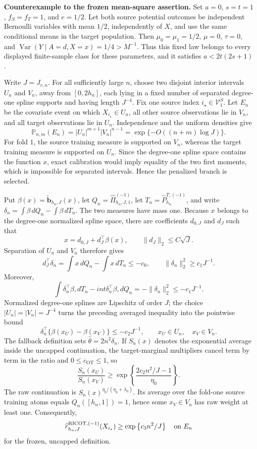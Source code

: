 \textbf{Counterexample to the frozen mean-square assertion.}
Set \(a=0\), \(s=t=1\), \(f_S=f_T=1\), and \(e=1/2\). Let both source potential outcomes be independent Bernoulli variables with mean \(1/2\), independently of \(X\), and use the same conditional means in the target population. Then \(\mu_0=\mu_1=1/2\), \(\mu=0\), \(\tau=0\), and \(\operatorname{Var}(Y\mid A=d,X=x)=1/4>M^{-1}\). Thus this fixed law belongs to every displayed finite-sample class for these parameters, and it satisfies \(a<2t(2s+1)\).

Write \(J=J_{r,n}\). For all sufficiently large \(n\), choose two disjoint interior intervals \(U_n\) and \(V_n\), away from \([0,2h_n]\), each lying in a fixed number of separated degree-one spline supports and having length \(J^{-4}\). Fix one source index \(i_\star\in\mathcal V^S_1\). Let \(E_n\) be the covariate event on which \(X_{i_\star}\in U_n\), all other source observations lie in \(V_n\), and all target observations lie in \(U_n\). Independence and the uniform densities give
\[
 \mathbb P_{n,m}(E_n)=|U_n|^{m+1}|V_n|^{n-1}
 =\exp\{-O((n+m)\log J)\}.
\]
For fold \(1\), the source training measure is supported on \(V_n\), whereas the target training measure is supported on \(U_n\). Since the degree-one spline space contains the function \(x\), exact calibration would imply equality of the two first moments, which is impossible for separated intervals. Hence the penalized branch is selected.

Put \(\beta(x)=\widetilde{\mathbf b}_{h_n,J}(x)\), let \(Q_n=\widehat\Pi^{(-1)}_{h_n,J,1}\), let \(T_n=\widehat P^{T,(-1)}_{h_n}\), and write \(\delta_n=\int\beta\,dQ_n-\int\beta\,dT_n\). The two measures have mass one. Because \(x\) belongs to the degree-one normalized spline space, there are coefficients \(d_{0,J}\) and \(d_J\) such that
\[
 x=d_{0,J}+d_J^\top\beta(x),
 \qquad \|d_J\|_2\le C\sqrt J.
\]
Separation of \(U_n\) and \(V_n\) therefore gives
\[
 d_J^\top\delta_n=\int x\,dQ_n-\int x\,dT_n\le-c_0,
 \qquad \|\delta_n\|_2^2\ge c_1J^{-1}.
\]
Moreover,
\[
 \int\delta_n^\top\beta,dT_n-int\delta_n^\top\beta,dQ_n=-\|\delta_n\|_2^2\le-c_1J^{-1}.
\]
Normalized degree-one splines are Lipschitz of order \(J\); the choice \(|U_n|=|V_n|=J^{-4}\) turns the preceding averaged inequality into the pointwise bound
\[
 \delta_n^\top\{\beta(x_U)-\beta(x_V)\}\le-c_2J^{-1},
 \qquad x_U\in U_n,\quad x_V\in V_n.
\]
The fallback definition sets \(\widehat\theta=2n^2\delta_n\). If \(S_n(x)\) denotes the exponential average inside the uncapped continuation, the target-marginal multipliers cancel term by term in the ratio and \(0\le c_{\mathrm{OT}}\le1\), so
\[
 \frac{S_n(x_U)}{S_n(x_V)}
 \ge \exp\left\{\frac{2c_2n^2/J-1}{\eta_0}\right\}.
\]
The raw continuation is \(S_n(x)^{\eta_0/(\eta_0+\lambda_0)}\). Its average over the fold-one source training atoms equals \(Q_n([h_n,1])=1\), hence some \(x_V\in V_n\) has raw weight at least one. Consequently,
\[
 \widehat r^{\mathrm{RICOT},(-1)}_{h_n,J}(X_{i_\star})
 \ge \exp\left\{c_3n^2/J\right\}
 \quad\hbox{on }E_n
\]
for the frozen, uncapped definition.

